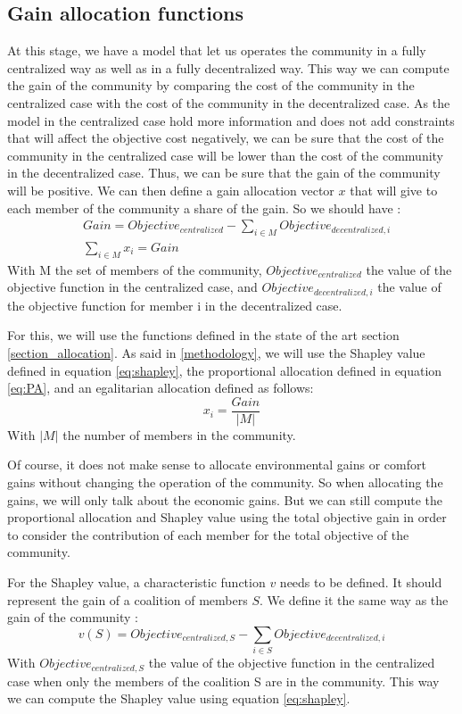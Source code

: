 \subsection{Gain allocation functions}

At this stage, we have a model that let us operates the community in a fully centralized way as well as in a fully decentralized way. This way we can compute the gain of the community by comparing the cost of the community in the centralized case with the cost of the community in the decentralized case. As the model in the centralized case hold more information and does not add constraints that will affect the objective cost negatively, we can be sure that the cost of the community in the centralized case will be lower than the cost of the community in the decentralized case. Thus, we can be sure that the gain of the community will be positive. We can then define a gain allocation vector $x$ that will give to each member of the community a share of the gain. So we should have :
\begin{align}
    &Gain = Objective_{centralized} - \sum_{i \in M} Objective_{decentralized,i} \\
    &\sum_{i \in M} x_i = Gain
\end{align}
With M the set of members of the community, $Objective_{centralized}$ the value of the objective function in the centralized case, and $Objective_{decentralized,i}$ the value of the objective function for member i in the decentralized case.

For this, we will use the functions defined in the state of the art section \ref{section_allocation}. As said in \ref{methodology}, we will use the Shapley value defined in equation \ref{eq:shapley}, the proportional allocation defined in equation \ref{eq:PA}, and an egalitarian allocation defined as follows:
\begin{equation}
    x_i = \frac{Gain}{|M|}
\end{equation}
With $|M|$ the number of members in the community. 

Of course, it does not make sense to allocate environmental gains or comfort gains without changing the operation of the community. So when allocating the gains, we will only talk about the economic gains. But we can still compute the proportional allocation and Shapley value using the total objective gain in order to consider the contribution of each member for the total objective of the community.

For the Shapley value, a characteristic function $v$ needs to be defined. It should represent the gain of a coalition of members $S$. We define it the same way as the gain of the community : 
\begin{equation}
    v(S) = Objective_{centralized, S} - \sum_{i \in S} Objective_{decentralized,i}
\end{equation} 
With $Objective_{centralized, S}$ the value of the objective function in the centralized case when only the members of the coalition S are in the community. This way we can compute the Shapley value using equation \ref{eq:shapley}.

